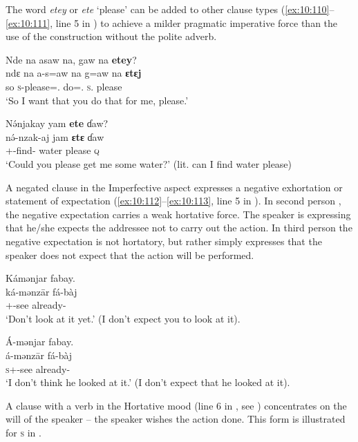 The word \textit{etey} or \textit{ete} ‘please’ can be added to other clause types (\ref{ex:10:110}--\ref{ex:10:111}, line 5 in ) to achieve a milder pragmatic imperative force than the use of the construction without the polite adverb.

\ea \label{ex:10:110}
Nde na  asaw  na,  gaw  na \textbf{etey}?\\
\gll  ndɛ  na   a-s=aw     na   g=aw     na   \textbf{ɛtɛj}\\
      so  {\PSP}   \textsc{s}-please={\oneS}.{\IO} {\PSP}   do={\oneS}.{\IO}  \textsc{s}.{\DO}  please\\
\glt  ‘So I want that you do that for me, please.’
\z 

\ea \label{ex:10:111}
N\'{ə}njakay  yam \textbf{ete} ɗaw?\\
\gll  n\'{ə}-nzak-aj    jam  \textbf{ɛtɛ}  ɗaw\\
      {\oneS}+{\IFV}-find{}-{\CL}  water  please  {\textsc{q}}\\
\glt  ‘Could you please get me some water?’ (lit. can I find water please)
\z 

A negated clause in the Imperfective aspect expresses a negative exhortation or statement of expectation (\ref{ex:10:112}--\ref{ex:10:113}, line 5 in ). In second person , the negative expectation carries a weak hortative force. The speaker is expressing that he/she expects the addressee not to carry out the action. In third person  the negative expectation is not hortatory, but rather simply expresses that the speaker does not expect that the action will be performed. 

\ea \label{ex:10:112}
Kámənjar  fabay.\\
\gll  ká-mənz\={a}r     fá-bàj\\
      {\twoS}+{\IFV}-see    already-{\NEG}\\
\glt  ‘Don’t look at it yet.’ (I don’t expect you to look at it).
\z 

\ea \label{ex:10:113}
Á-mənjar     fabay.\\
\gll  á-mənz\={a}r     fá-bàj\\
      \textsc{s}+{\IFV}{}-see    already-{\NEG}\\
\glt  ‘I don’t think he looked at it.’ (I don’t expect that he looked at it).
\z 

A clause with a verb in the Hortative mood (line 6 in , see ) concentrates on the will of the speaker -- the speaker wishes the action done. This form is illustrated for \textsc{s} in . 

